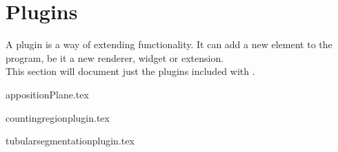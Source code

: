 \section{Plugins}

A plugin is a way of extending \espina{} functionality. It can
add a new element to the program, be it a new renderer, widget or
extension. \\
This section will document just the plugins included with \espina.

 {appositionPlane.tex}

 {countingregionplugin.tex}

 {tubularsegmentationplugin.tex}

